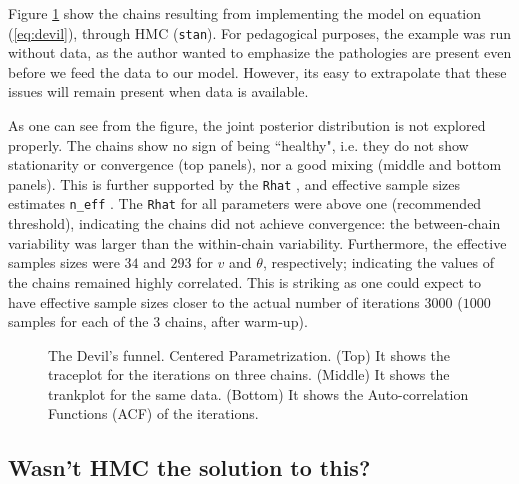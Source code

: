 Figure \ref{fig:devil_CE} show the chains resulting from implementing the model on equation (\ref{eq:devil}), through HMC (\texttt{stan}). For pedagogical purposes, the example was run without data, as the author wanted to emphasize the pathologies are present even before we feed the data to our model. However, its easy to extrapolate that these issues will remain present when data is available.

As one can see from the figure, the joint posterior distribution is not explored properly. The chains show no sign of being ``healthy", i.e. they do not show stationarity or convergence (top panels), nor a good mixing (middle and bottom panels). This is further supported by the \texttt{Rhat} \cite{Gelman_et_al_2014}, and effective sample sizes estimates \texttt{n\_eff} \cite{Gelman_et_al_2014}. The \texttt{Rhat} for all parameters were above one (recommended threshold), indicating the chains did not achieve convergence: the between-chain variability was larger than the within-chain variability. Furthermore, the effective samples sizes were $34$ and $293$ for $v$ and $\theta$, respectively; indicating the values of the chains remained highly correlated. This is striking as one could expect to have effective sample sizes closer to the actual number of iterations $3000$ ($1000$ samples for each of the $3$ chains, after warm-up).
%
\begin{figure}[h]
	\centering
	\begin{subfigure}
		\texttt{[image: 1\_trace\_CE\_simple]}
	\end{subfigure}
	\begin{subfigure}
		\texttt{[image: 1\_trank\_CE\_simple]}
	\end{subfigure}
	\begin{subfigure}
		\texttt{[image: 1\_acf\_CE\_simple]}
	\end{subfigure}
	\caption[The Devil's funnel. Centered Parametrization. Stan.]%
	{The Devil's funnel. Centered Parametrization. (Top) It shows the traceplot for the iterations on three chains. (Middle) It shows the trankplot for the same data. (Bottom) It shows the Auto-correlation Functions (ACF) of the iterations.}
	\label{fig:devil_CE}
\end{figure}


\subsection{Wasn't HMC the solution to this?}

